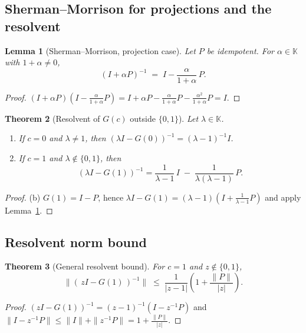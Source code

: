 \documentclass[11pt]{article}
\newtheorem{theorem}{Theorem}[section]
\newtheorem{lemma}[theorem]{Lemma}
\theoremstyle{definition}
\newcommand{\K}{\mathbb{K}}
\begin{document}
\subsection{Sherman--Morrison for projections and the resolvent}

\begin{lemma}[Sherman--Morrison, projection case]\label{lem:SM-human}
Let $P$ be idempotent. For $\alpha\in\K$ with $1+\alpha\neq 0$,
\[
(I+\alpha P)^{-1} \;=\; I - \frac{\alpha}{1+\alpha}\,P.
\]
\end{lemma}

\begin{proof}
$(I+\alpha P)\left(I-\frac{\alpha}{1+\alpha}P\right)
= I + \alpha P - \frac{\alpha}{1+\alpha}P - \frac{\alpha^2}{1+\alpha}P
= I.$
\end{proof}

\begin{theorem}[Resolvent of $G(c)$ outside $\{0,1\}$]\label{thm:resolvent-human}
Let $\lambda\in\K$.
\begin{enumerate}
\item If $c=0$ and $\lambda\neq 1$, then $(\lambda I - G(0))^{-1}=(\lambda-1)^{-1} I$.
\item If $c=1$ and $\lambda\notin\{0,1\}$, then
\[
(\lambda I - G(1))^{-1}
= \frac{1}{\lambda-1}\,I \;-\; \frac{1}{\lambda(\lambda-1)}\,P.
\]
\end{enumerate}
\end{theorem}

\begin{proof}
(b) $G(1)=I-P$, hence $\lambda I - G(1)=(\lambda-1)\left(I+\frac{1}{\lambda-1}P\right)$ and apply Lemma~\ref{lem:SM-human}.
\end{proof}

\subsection{Resolvent norm bound}

\begin{theorem}[General resolvent bound]\label{thm:bound-human}
For $c=1$ and $z\notin\{0,1\}$,
\[
\big\|(\,zI - G(1)\,)^{-1}\big\| \;\le\; \frac{1}{|z-1|}\left(1 + \frac{\|P\|}{|z|}\right).
\]
\end{theorem}

\begin{proof}
$(zI - G(1))^{-1}=(z-1)^{-1}\left(I - z^{-1}P\right)$ and $\|I - z^{-1}P\|\le \|I\| + \|z^{-1}P\|=1+\frac{\|P\|}{|z|}$.
\end{proof}
\end{document}
